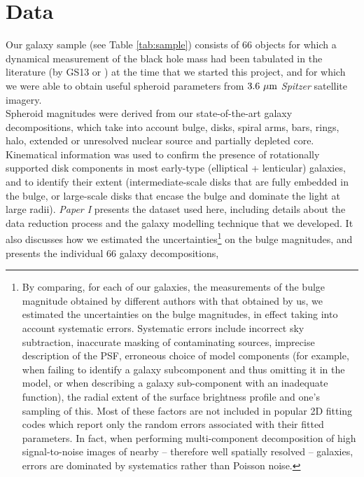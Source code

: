 \documentclass[preprint2]{emulateapj}
\begin{document}
\section{Data}
\label{sec:data}
Our galaxy sample (see Table \ref{tab:sample}) 
consists of 66 objects for which a dynamical measurement of the black hole mass had been tabulated in the literature 
(by GS13 or \citealt{rusli2013bhmassesDM}) at the time that we started this project, 
and for which we were able to obtain useful spheroid parameters from $3.6\rm~\mu m$ \emph{Spitzer} satellite imagery. \\
Spheroid magnitudes were derived from our state-of-the-art galaxy decompositions, which take into account 
bulge, disks, spiral arms, bars, rings, halo, extended or unresolved nuclear source and partially depleted core.
Kinematical information \citep{atlas3dIII-MNRAS,scott2014,arnold2014} was used 
to confirm the presence of rotationally supported disk components in most early-type (elliptical + lenticular) galaxies, 
and to identify their extent 
(intermediate-scale disks that are fully embedded in the bulge, 
or large-scale disks that encase the bulge and dominate the light at large radii). 
\emph{Paper I} presents the dataset used here, 
including details about the data reduction process and the galaxy modelling technique that we developed. 
It also discusses how we estimated the uncertainties\footnote{By comparing, for each of our galaxies, the measurements of the bulge magnitude 
obtained by different authors with that obtained by us, we estimated the uncertainties on the bulge magnitudes, 
in effect taking into account systematic errors. 
Systematic errors include incorrect sky subtraction, inaccurate masking of contaminating sources, imprecise description of the PSF, 
erroneous choice of model components (for example, when failing to identify a galaxy subcomponent and thus omitting it in the model, 
or when describing a galaxy sub-component with an inadequate function), 
the radial extent of the surface brightness profile and one's sampling of this. 
Most of these factors are not included in popular 2D fitting codes which report only the random errors associated with their fitted parameters. 
In fact, when performing multi-component decomposition of high signal-to-noise images of nearby -- therefore well spatially resolved -- galaxies, 
errors are dominated by systematics rather than Poisson noise.} 
on the bulge magnitudes, and presents the individual 66 galaxy decompositions, 
\end{document}

